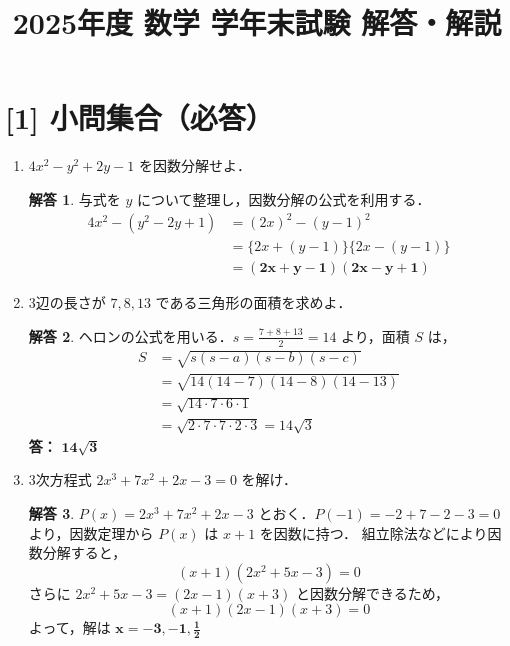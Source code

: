 \documentclass[dvipdfmx]{jlreq}
\theoremstyle{definition}
\newtheorem*{solution}{解答}
\begin{document}
\title{2025年度 数学 学年末試験 解答・解説}
\date{}
\author{}
\maketitle

\section*{[1] 小問集合（必答）}

\begin{enumerate}[label=(\arabic*)]
    \item $4x^2 - y^2 + 2y - 1$ を因数分解せよ．
    \begin{solution}
    与式を $y$ について整理し，因数分解の公式を利用する．
    \begin{align*}
        4x^2 - (y^2 - 2y + 1) &= (2x)^2 - (y-1)^2 \\
        &= \{2x + (y-1)\}\{2x - (y-1)\} \\
        &= \bm{(2x+y-1)(2x-y+1)}
    \end{align*}
    \end{solution}

\vspace{5mm}

    \item 3辺の長さが $7, 8, 13$ である三角形の面積を求めよ．
    \begin{solution}
    ヘロンの公式を用いる．$\displaystyle s = \frac{7+8+13}{2} = 14$ より，面積 $S$ は，
    \begin{align*}
        S &= \sqrt{s(s-a)(s-b)(s-c)} \\
          &= \sqrt{14(14-7)(14-8)(14-13)} \\
          &= \sqrt{14 \cdot 7 \cdot 6 \cdot 1} \\
          &= \sqrt{2 \cdot 7 \cdot 7 \cdot 2 \cdot 3} = 14\sqrt{3}
    \end{align*}
    \textbf{答：} $\bm{14\sqrt{3}}$
    \end{solution}

\vspace{5mm}

    \item 3次方程式 $2x^3 + 7x^2 + 2x - 3 = 0$ を解け．
    \begin{solution}
    $P(x) = 2x^3 + 7x^2 + 2x - 3$ とおく．$P(-1) = -2 + 7 - 2 - 3 = 0$ より，因数定理から $P(x)$ は $x+1$ を因数に持つ．
    組立除法などにより因数分解すると，
    \[ (x+1)(2x^2 + 5x - 3) = 0 \]
    さらに $2x^2 + 5x - 3 = (2x-1)(x+3)$ と因数分解できるため，
    \[ (x+1)(2x-1)(x+3) = 0 \]
    よって，解は $\displaystyle \bm{x = -3, -1, \frac{1}{2}}$
    \end{solution}


\end{enumerate}
\end{document}
